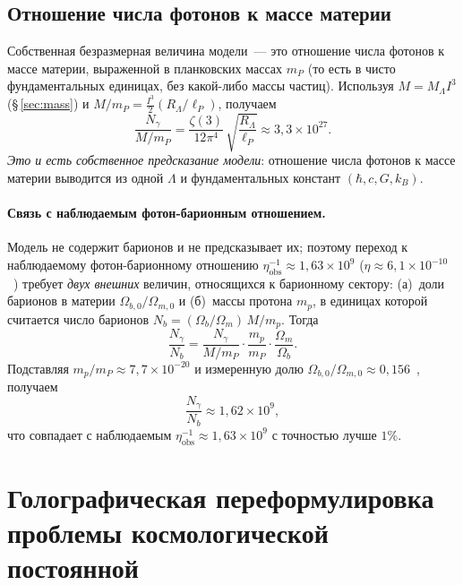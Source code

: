 \documentclass[12pt,a4paper]{article}
\begin{document}
\subsection{Отношение числа фотонов к массе материи}
Собственная безразмерная величина модели~--- это отношение числа фотонов к массе материи, выраженной в планковских массах $m_P$ (то есть в чисто фундаментальных единицах, без какой-либо массы частиц). Используя $M = M_\Lambda I^3$ (\S\,\ref{sec:mass}) и $M/m_P = \tfrac{I^3}{2}(R_\Lambda/\ell_P)$, получаем
\begin{equation}
\boxed{\frac{N_\gamma}{M/m_P} = \frac{\zeta(3)}{12\pi^4}\,\sqrt{\frac{R_\Lambda}{\ell_P}} \approx 3{,}3 \times 10^{27}.} \label{eq:ratio_particles}
\end{equation}
\emph{Это и есть собственное предсказание модели}: отношение числа фотонов к массе материи выводится из одной $\Lambda$ и фундаментальных констант $(\hbar,c,G,k_B)$.

\paragraph{Связь с наблюдаемым фотон-барионным отношением.} Модель не содержит барионов и не предсказывает их; поэтому переход к наблюдаемому фотон-барионному отношению $\eta^{-1}_{\mathrm{obs}}\approx1{,}63\times10^9$ ($\eta\approx6{,}1\times10^{-10}$~\cite{Planck2018}) требует \emph{двух внешних} величин, относящихся к барионному сектору: (а)~доли барионов в материи $\Omega_{b,0}/\Omega_{m,0}$ и (б)~массы протона $m_p$, в единицах которой считается число барионов $N_b = (\Omega_b/\Omega_m)\,M/m_p$. Тогда
\begin{equation}
\frac{N_\gamma}{N_b} = \frac{N_\gamma}{M/m_P}\cdot\frac{m_p}{m_P}\cdot\frac{\Omega_m}{\Omega_b}.
\end{equation}
Подставляя $m_p/m_P\approx7{,}7\times10^{-20}$ и измеренную долю $\Omega_{b,0}/\Omega_{m,0}\approx0{,}156$~\cite{Planck2018}, получаем
\begin{equation}
\boxed{\frac{N_\gamma}{N_b} \approx 1{,}62\times10^{9},}
\end{equation}
что совпадает с наблюдаемым $\eta^{-1}_{\mathrm{obs}}\approx1{,}63\times10^9$ с точностью лучше $1\%$.

\section{Голографическая переформулировка проблемы космологической постоянной}
\end{document}
